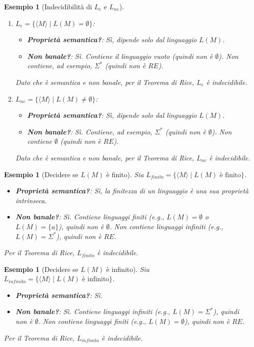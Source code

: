 \documentclass[a4paper, 11pt]{book} %
\newtheorem{example}[theorem]{Esempio}
\theoremstyle{definition}
\begin{document}
\begin{example}[Indecidibilità di $L_e$ e $L_{ne}$]
\begin{enumerate}
    \item $L_e = \{\langle M \rangle \mid L(M) = \emptyset\}$:
    \begin{itemize}
        \item \textbf{Proprietà semantica?}: Sì, dipende solo dal linguaggio $L(M)$.
        \item \textbf{Non banale?}: Sì. Contiene il linguaggio vuoto (quindi non è $\emptyset$). Non contiene, ad esempio, $\Sigma^*$ (quindi non è $RE$).
    \end{itemize}
    Dato che è semantica e non banale, per il Teorema di Rice, $L_e$ è indecidibile.
    \item $L_{ne} = \{\langle M \rangle \mid L(M) \neq \emptyset\}$:
    \begin{itemize}
        \item \textbf{Proprietà semantica?}: Sì, dipende solo dal linguaggio $L(M)$.
        \item \textbf{Non banale?}: Sì. Contiene, ad esempio, $\Sigma^*$ (quindi non è $\emptyset$). Non contiene $\emptyset$ (quindi non è $RE$).
    \end{itemize}
    Dato che è semantica e non banale, per il Teorema di Rice, $L_{ne}$ è indecidibile.
\end{enumerate}
\end{example}

\begin{example}[Decidere se $L(M)$ è finito]
Sia $L_{finito} = \{\langle M \rangle \mid L(M) \text{ è finito}\}$.
\begin{itemize}
    \item \textbf{Proprietà semantica?}: Sì, la finitezza di un linguaggio è una sua proprietà intrinseca.
    \item \textbf{Non banale?}: Sì. Contiene linguaggi finiti (e.g., $L(M)=\emptyset$ o $L(M)=\{a\}$), quindi non è $\emptyset$. Non contiene linguaggi infiniti (e.g., $L(M)=\Sigma^*$), quindi non è $RE$.
\end{itemize}
Per il Teorema di Rice, $L_{finito}$ è indecidibile.
\end{example}

\begin{example}[Decidere se $L(M)$ è infinito]
Sia $L_{infinito} = \{\langle M \rangle \mid L(M) \text{ è infinito}\}$.
\begin{itemize}
    \item \textbf{Proprietà semantica?}: Sì.
    \item \textbf{Non banale?}: Sì. Contiene linguaggi infiniti (e.g., $L(M)=\Sigma^*$), quindi non è $\emptyset$. Non contiene linguaggi finiti (e.g., $L(M)=\emptyset$), quindi non è $RE$.
\end{itemize}
Per il Teorema di Rice, $L_{infinito}$ è indecidibile.
\end{example}
\end{document}

